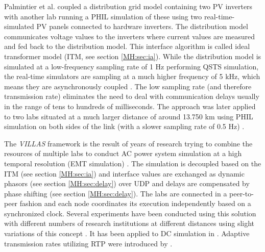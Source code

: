 \documentclass[a4paper,ngerman]{atseminar}
\begin{document}

Palmintier et al. \cite{palmintier2015} coupled a distribution grid model containing two PV inverters with another lab running a PHIL simulation of these using two real-time-simulated PV panels connected to hardware inverters. The distribution model communicates voltage values to the inverters where current values are measured and fed back to the distribution model. This interface algorithm is called ideal transformer model (ITM, see section \ref{MH:sec:ia}).
While the distribution model is simulated at a low-frequency sampling rate of 1 Hz performing QSTS simulation, the real-time simulators are sampling at a much higher frequency of 5 kHz, which means they are asynchronously coupled \cite{syed2020standard}. The low sampling rate (and therefore transmission rate) eliminates the need to deal with communication delays usually in the range of tens to hundreds of milliseconds.
The approach was later applied to two labs situated at a much larger distance of around 13.750 km using PHIL simulation on both sides of the link (with a slower sampling rate of 0.5 Hz) \cite{lundstrom2017}.


The \textit{VILLAS} framework is the result of years of research trying to combine the resources of multiple labs to conduct AC power system simulation at a high temporal resolution (EMT simulation) \cite{stevic2017europe, monti2018, vogel2019improve}. 
The simulation is decoupled based on the ITM (see section \ref{MH:sec:ia}) and interface values are exchanged as dynamic phasors (see section \ref{MH:sec:delay}) over UDP and delays are compensated by phase shifting \cite{sansano2015harmonic} (see section \ref{MH:sec:delay}). The labs are connected in a peer-to-peer fashion and each node coordinates its execution independently based on a synchronized clock. Several experiments have been conducted using this solution with different numbers of research institutions at different distances using slight variations of this concept \cite{stevic2015feasibility, stevic2015sim, stevic2017europe, vogel2018distributed, monti2018, vogel2019improve}.
It has been applied to DC simulation in \cite{stevic2018dc}. Adaptive transmission rates utilizing RTP were introduced by  \cite{vogel2019improve}.
\end{document}
